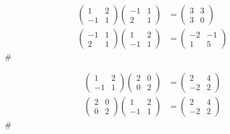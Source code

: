 \begin{example}\label{ex:b6-1-34}
\begin{align*}
\begin{pmatrix} 1 & 2 \\ -1 & 1 \end{pmatrix} \begin{pmatrix} -1 & 1 \\ 2 & 1 \end{pmatrix} &= \begin{pmatrix} 3 & 3 \\ 3 & 0 \end{pmatrix} \\
\begin{pmatrix} -1 & 1 \\ 2 & 1 \end{pmatrix} \begin{pmatrix} 1 & 2 \\ -1 & 1 \end{pmatrix} &= \begin{pmatrix} -2 & -1 \\ 1 & 5 \end{pmatrix}
\end{align*}\hfill$\#$
\end{example}

\begin{example}\label{ex:b6-1-35}
\begin{align*}
\begin{pmatrix} 1 & 2 \\ -1 & 1 \end{pmatrix} \begin{pmatrix} 2 & 0 \\ 0 & 2 \end{pmatrix} &= \begin{pmatrix} 2 & 4 \\ -2 & 2 \end{pmatrix} \\
\begin{pmatrix} 2 & 0 \\ 0 & 2 \end{pmatrix} \begin{pmatrix} 1 & 2 \\ -1 & 1 \end{pmatrix} &= \begin{pmatrix} 2 & 4 \\ -2 & 2 \end{pmatrix}
\end{align*}\hfill$\#$
\end{example}

